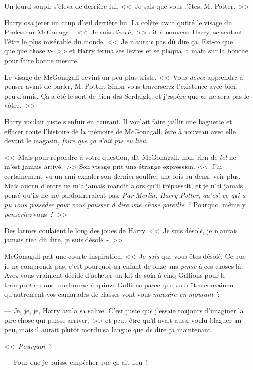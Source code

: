 Un lourd soupir s'éleva de derrière lui. <<~Je sais que vous l'êtes, M. Potter.~>>

Harry osa jeter un coup d'œil derrière lui. La colère avait quitté le visage du Professeur McGonagall. <<~Je suis désolé,~>> dit à nouveau Harry, se sentant l'être le plus misérable du monde. <<~Je n'aurais pas dû dire ça. Est-ce que quelque chose v-~>> et Harry ferma ses lèvres et se plaqua la main sur la bouche pour faire bonne mesure.

Le visage de McGonagall devint un peu plus triste. <<~Vous \emph{devez} apprendre à penser avant de parler, M. Potter. Sinon vous traverserez l'existence avec bien peu d'amis. Ça a été le sort de bien des Serdaigle, et j'espère que ce ne sera pas le vôtre.~>>

Harry voulait juste s'enfuir en courant. Il voulait faire jaillir une baguette et effacer toute l'histoire de la mémoire de McGonagall, être à nouveau avec elle devant le magasin, \emph{faire que ça n'ait pas eu lieu}.

<<~Mais pour répondre à votre question, dit McGonagall, non, rien de \emph{tel} ne m'est jamais arrivé.~>> Son visage prit une étrange expression. <<~J'ai certainement vu un ami exhaler son dernier souffre, une fois ou deux, voir plus. Mais aucun d'entre ne m'a jamais maudit alors qu'il trépassait, et je n'ai jamais pensé qu'ils ne me pardonneraient pas. \emph{Par Merlin, Harry Potter, qu'est-ce qui a pu vous posséder pour vous pousser à dire une chose pareille~?} Pourquoi même y \emph{penseriez}-vous~?~>>

Des larmes coulaient le long des joues de Harry. <<~Je suis désolé, je n'aurais jamais rien dû dire, je suis désolé~-~>>

McGonagall prit une courte inspiration. <<~Je \emph{sais} que vous êtes désolé. Ce que je ne comprends pas, c'est pourquoi un enfant de onze ans \emph{pense} à ces choses-là. Avez-vous vraiment décidé d'acheter un kit de soin à cinq Gallions pour le transporter dans une bourse à quinze Gallions parce que vous êtes convaincu qu'autrement vos camarades de classes vont vous \emph{maudire en mourant}~?

--- Je, je,  je, Harry avala sa salive. C'est juste que j'essaie toujours d'imaginer la pire chose qui puisse arriver,~>> et peut-être qu'il avait aussi voulu blaguer un peu, mais il aurait plutôt mordu sa langue que de dire ça maintenant.

<<~\emph{Pourquoi}~?

--- Pour que je puisse empêcher que ça ait lieu~!

